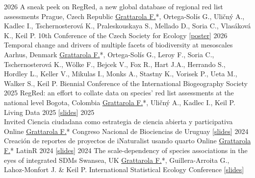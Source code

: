 \documentclass[9pt]{developercv} %
\begin{document}
\hfill



\begin{entrylist}
	\entrylong
		{2026}
		{A sneak peek on RegRed, a new global database of regional red list assessments}
		{Prague, Czech Republic}
		{\underline{Grattarola F.}*, Ortega-Solís G., Uličný A., Kadlec I., Tschernosterová K., Praleskouskaya S., Mellado D., Soria C., Vlasáková K., Keil P. \slashsep 10th Conference of the Czech Society for Ecology [\href{https://flograttarola.com/talk/CSPE_2026.pdf}{poster}]}
	\entrylong
		{2026}
		{Temporal change and drivers of multiple facets of biodiversity at mesoscales}
		{Aarhus, Denmark}
		{\underline{Grattarola F.}*, Ortega-Solís G., Leroy F., Soria C., Tschernosterová K., Wölke F., Bejcek V., Fox R., Hart J.A., Herrando S., Hordley L., Keller V., Mikulas I., Monks A., Stastny K., Vorisek P., Ueta M., Walker S., Keil P. \slashsep Biennial Conference of the International Biogeography Society}
	\entrylong
		{2025}
		{RegRed: an effort to collate data on species' red list assessments at the national level}
		{Bogota, Colombia}
		{\underline{Grattarola F.}*, Uličný A., Kadlec I., Keil P. \slashsep Living Data 2025 [\href{https://flograttarola.com/talk/regred-an-effort-to-collate-data-on-species-red-list-assessments-at-the-national-level/6798638-1_7020809_Grattarola_Oral.pdf}{slides}]}
	\entrylong
		{2025\\\footnotesize{Invited}}
		{Ciencia ciudadana como estrategia de ciencia abierta y participativa}
		{Online}
		{\underline{Grattarola F.}* \slashsep Congreso Nacional de Biociencias de Uruguay [\href{https://flograttarola.com/talk/ciencia-ciudadana-como-estrategia-de-ciencia-abierta-y-participativa/charla_CNB_2025.pdf}{slides}]}
	\entrylong
		{2024}
		{Creación de reportes de proyectos de iNaturalist usando quarto}
		{Online}
		{\underline{Grattarola F.}* \slashsep LatinR 2024 [\href{https://bienflorencia.github.io/LatinR2024/slides/Grattarola_LatinR2024_slides.htm}{slides}]}
	\entrylong
		{2024}
		{The scale-dependency of species associations in the eyes of integrated SDMs}
		{Swansea, UK}
		{\underline{Grattarola F.}*, Guillera-Arroita G., Lahoz-Monfort J. \& Keil P. \slashsep International Statistical Ecology Conference [\href{https://flograttarola.com/talk/the-scale-dependency-of-species-associations-in-the-eyes-of-integrated-species-distribution-models/ISEC_2024_Grattarola_IJSDMs.pdf}{slides}]}

\end{entrylist}
\end{document}
